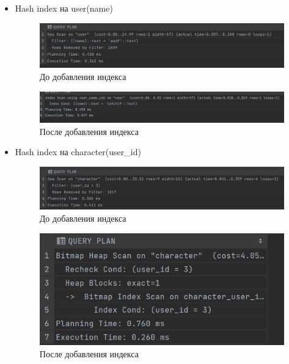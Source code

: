 \begin{itemize}
    \item Hash index на user(name)
    \begin{figure}[H]
	\begin{center}
		\includegraphics[scale=0.7]{images/user_name_not_index.png}
            \caption{До добавления индекса}
	\end{center}
    \end{figure}
    \begin{figure}[H]
	\begin{center}
		\includegraphics[scale=0.4]{images/user_name_index.jpg}
            \caption{После добавления индекса}
	\end{center}
    \end{figure}
    
    \item Hash index на character(user\_id)
    \begin{figure}[H]
	\begin{center}
		\includegraphics[scale=0.7]{images/character_user_id_before.jpg}
            \caption{До добавления индекса}
	\end{center}
    \end{figure}
    \begin{figure}[H]
	\begin{center}
		\includegraphics[scale=1]{images/character_user_id_after.jpg}
            \caption{После добавления индекса}
	\end{center}
    \end{figure}


\end{itemize}
